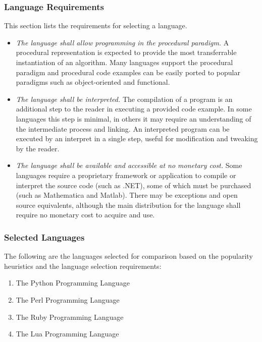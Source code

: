 \documentclass[a4paper, 11pt]{article}
\begin{document}
% 
% 
\subsubsection{Language Requirements}
\label{subsubsec:requirements}
This section lists the requirements for selecting a language.

\begin{itemize}
	\item \emph{The language shall allow programming in the procedural paradigm.} A procedural representation is expected to provide the most transferrable instantiation of an algorithm. Many languages support the procedural paradigm and procedural code examples can be easily ported to popular paradigms such as object-oriented and functional.
	\item \emph{The language shall be interpreted.} The compilation of a program is an additional step to the reader in executing a provided code example. In some languages this step is minimal, in others it may require an understanding of the intermediate process and linking. An interpreted program can be executed by an interpret in a single step, useful for modification and tweaking by the reader.
	\item \emph{The language shall be available and accessible at no monetary cost.} Some languages require a proprietary framework or application to compile or interpret the source code (such as .NET), some of which must be purchased (such as Mathematica and Matlab). There may be exceptions and open source equivalents, although the main distribution for the language shall require no monetary cost to acquire and use.
\end{itemize}

% 
% 
\subsubsection{Selected Languages}
\label{subsubsec:selection}
The following are the languages selected for comparison based on the popularity heuristics and the language selection requirements:
\begin{enumerate}
	\item The Python Programming Language
	\item The Perl Programming Language
	\item The Ruby Programming Language
	\item The Lua Programming Language
\end{enumerate}
\end{document}
